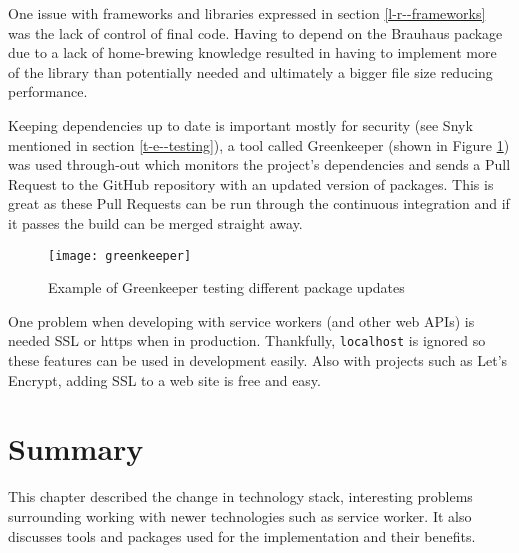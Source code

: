 One issue with frameworks and libraries expressed in section \ref{l-r--frameworks} was the lack of control of final code. Having to depend on the Brauhaus package due to a lack of home-brewing knowledge resulted in having to implement more of the library than potentially needed and ultimately a bigger file size reducing performance.

Keeping dependencies up to date is important mostly for security (see Snyk mentioned in section \ref{t-e--testing}), a tool called Greenkeeper (shown in Figure \ref{figure-greenkeeper}) was used through-out which monitors the project's dependencies and sends a Pull Request to the GitHub repository with an updated version of packages. This is great as these Pull Requests can be run through the continuous integration and if it passes the build can be merged straight away. \cite{greenkeeper}

\begin{figure}[H]
  \centering
    \texttt{[image: greenkeeper]}
  \caption{Example of Greenkeeper testing different package updates}
  \label{figure-greenkeeper}
\end{figure}

One problem when developing with service workers (and other web APIs) is needed SSL or https when in production. Thankfully, \verb|localhost| is ignored so these features can be used in development easily. Also with projects such as Let's Encrypt, adding SSL to a web site is free and easy. \cite{letsencrypt}

\section{Summary} \label{s-i--summary}

This chapter described the change in technology stack, interesting problems surrounding working with newer technologies such as service worker. It also discusses tools and packages used for the implementation and their benefits.
